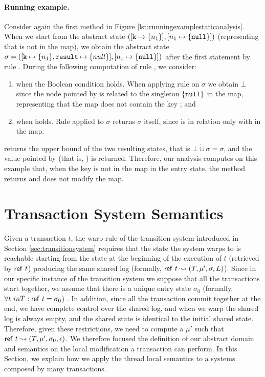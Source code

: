 \paragraph{Running example.}
Consider again the first method in Figure \ref{lst:runningexamplestaticanalysis}. When we start from the abstract state  $([\mathtt{k} \mapsto \{n_1\}], [n_1 \mapsto \{\mathtt{null}\}])$ (representing that  is not in the map), we obtain the abstract state $\sigma = ([\mathtt{k} \mapsto \{n_1\}, \mathtt{result} \mapsto \{null\}], [n_1 \mapsto \{\mathtt{null}\}])$ after the first statement by rule . During the following computation of rule , we consider:
\begin{enumerate}
	\item when the Boolean condition  holds. When applying rule  on $\sigma$ we obtain $\bot$ since the node pointed by  is related to the singleton $\{\mathtt{null}\}$ in the map, representing that the map does not contain the key ; and
	\item when  holds. Rule  applied to $\sigma$ returns $\sigma$ itself, since  is in relation only with  in the map.
\end{enumerate}
 returns the upper bound of the two resulting states, that is $\bot \dot{\cup} \sigma = \sigma$, and the value pointed by  (that is, ) is returned.
Therefore, our analysis computes on this example that, when the key is not in the map in the entry state, the method returns  and does not modify the map.


\section{Transaction System Semantics}

Given a transaction $t$, the {\sf warp} rule of the transition system introduced in Section \ref{sec:transitionsystem} requires that the state the system warps to is reachable starting from the state at the beginning of the execution of $t$ (retrieved by ${\sf ref}\ t$) producing the same shared log (formally, ${\sf ref}\ t \leadsto (T,\mu', \sigma, L)$). Since in our specific instance of the transition system we suppose that all the transactions start together, we assume that there is a unique entry state $\sigma_0$ (formally, $\forall t \ in T : {\sf ref}\ t=\sigma_0$) . In addition, since all the transaction commit together at the end, we have complete control over the shared log, and when we warp the shared log is always empty, and the shared state is identical to the initial shared state. Therefore, given these restrictions, we need to compute a $\mu'$ such that ${\sf ref}\ t \leadsto (T,\mu', \sigma_0, \epsilon)$. We therefore focused the definition of our abstract domain and semantics on the local modification a transaction can perform. In this Section, we explain how we apply the thread local semantics to a systems composed by many transactions.

